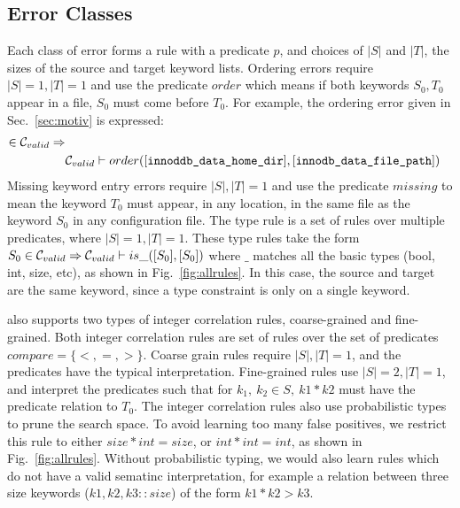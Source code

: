 \subsection{Error Classes}
Each class of error forms a rule with a predicate $p$, and choices of $|S|$ and $|T|$, the sizes of the source and target keyword lists.
Ordering errors require $|S|=1, |T|=1$ and use the predicate $order$ which means if both keywords $S_0,T_0$ appear in a file, $S_0$ must come before $T_0$.
For example, the ordering error given in Sec.~\ref{sec:motiv} is expressed:
%
\begin{align*}
[\texttt{innodb\_data\_home\_dir}&] \in \validSet \implies \\
&\validSet \vdash order([\texttt{innoddb\_data\_home\_dir}],[\texttt{innodb\_data\_file\_path}])
\end{align*}
%
Missing keyword entry errors require $|S|, |T| = 1$ and use the predicate $missing$ to mean the keyword $T_0$ must appear, in any location, in the same file as the keyword $S_0$ in any configuration file.
The type rule is a set of rules over multiple predicates, where $|S|=1, |T|=1$.
These type rules take the form $S_0 \in \mathcal{C}_{valid} \Rightarrow \mathcal{C}_{valid} \vdash is\_([S_0],[S_0])$ where $\_$ matches all the basic types (bool, int, size, etc), as shown in Fig.~\ref{fig:allrules}.
In this case, the source and target are the same keyword, since a type constraint is only on a single keyword.

\app also supports two types of integer correlation rules, coarse-grained and fine-grained.
Both integer correlation rules are set of rules over the set of predicates $compare=\{<,=,>\}$.
Coarse grain rules require $|S|, |T| = 1$, and the predicates have the typical interpretation.
Fine-grained rules use $|S|=2,|T|=1$, and interpret the predicates such that for $k_1,\ k_2 \in S,\ k1*k2$ must have the predicate relation to $T_0$.
The integer correlation rules also use probabilistic types to prune the search space.
To avoid learning too many false positives, we restrict this rule to either $size*int=size$, or $int*int = int$, as shown in Fig.~\ref{fig:allrules}.
Without probabilistic typing, we would also learn rules which do not have a valid sematinc interpretation, for example a relation between three size keywords ($k1,k2,k3::size$) of the form $k1*k2>k3$.

